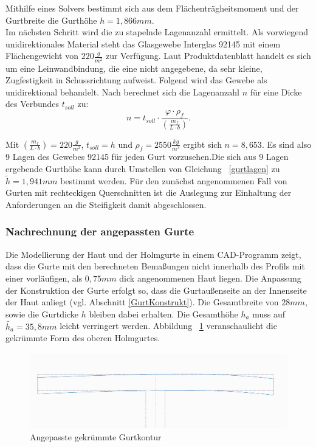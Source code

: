 \noindent Mithilfe eines Solvers bestimmt sich aus dem Flächenträgheitsmoment und der Gurtbreite die Gurthöhe $ h=1,866mm $.\\
\noindent Im nächsten Schritt wird die zu stapelnde Lagenanzahl ermittelt. Als vorwiegend unidirektionales Material steht das Glasgewebe Interglas 92145 mit einem Flächengewicht von $ 220\frac{g}{m^{2}} $ zur Verfügung. Laut Produktdatenblatt \cite{item17} handelt es sich um eine Leinwandbindung, die eine nicht angegebene, da sehr kleine, Zugfestigkeit in Schussrichtung aufweist. Folgend wird das Gewebe als unidirektional behandelt. Nach \cite{item3} berechnet sich die Lagenanzahl $ n $ für eine Dicke des Verbundes $ t_{soll} $ zu:\\

\begin{equation}\label{Dicke}
	\label{gurtlagen}
	n=t_{soll}\cdot \frac{\varphi\cdot\rho_{f}}{\left(\frac{m_{f}}{L\cdot b}\right)}.
\end{equation}

\noindent Mit $ \left(\frac{m_{f}}{L\cdot b}\right) = 220\frac{g}{m^{2}} $, $ t_{soll}=h $ und $ \rho_{f}=2550\frac{kg}{m^{3}} $ ergibt sich $ n=8,653 $. Es sind also 9 Lagen des Gewebes 92145 für jeden Gurt vorzusehen.Die sich aus 9 Lagen ergebende Gurthöhe kann durch Umstellen von Gleichung ~\ref{gurtlagen} zu $ \tilde{h}=1,941mm $ bestimmt werden. Für den zunächst angenommenen Fall von Gurten mit rechteckigen Querschnitten ist die Auslegung zur Einhaltung der Anforderungen an die Steifigkeit damit abgeschlossen.\\


\subsubsection{Nachrechnung der angepassten Gurte} \label{NachrechnungGurte}
 Die Modellierung der Haut und der Holmgurte in einem CAD-Programm zeigt, dass die Gurte mit den berechneten Bemaßungen nicht innerhalb des Profils mit einer vorläufigen, als $ 0,75mm $ dick angenommenen Haut liegen. Die Anpassung der Konstruktion der Gurte erfolgt so, dass die Gurtaußenseite an der Innenseite der Haut anliegt (vgl. Abschnitt \ref{GurtKonstrukt}). Die Gesamtbreite von $ 28mm $, sowie die Gurtdicke $ h $ bleiben dabei erhalten. Die Gesamthöhe $ h_{a} $ muss auf $ \tilde{h_{a}}=35,8mm $ leicht verringert werden. Abbildung ~\ref{fig: KrummerGurt} veranschaulicht die gekrümmte Form des oberen Holmgurtes.
 \begin{figure}[h]
 	\includegraphics[width=1.0\textwidth]{Bilder/KrummerGurt.jpg}
 	\caption{Angepasste gekrümmte Gurtkontur}
 	\label{fig: KrummerGurt}
 \end{figure}

